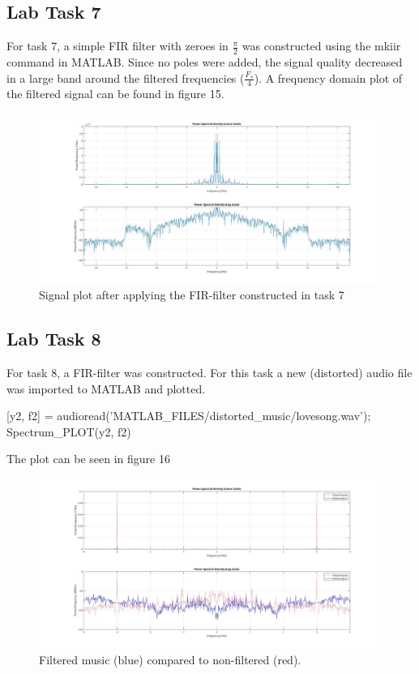 \documentclass[a4paper,11pt]{article}
\begin{document}
\subsection{Lab Task 7}
For task 7, a simple FIR filter with zeroes in \pm$\frac{\pi}{2}$ was constructed using the mkiir command in MATLAB. Since no poles were added, the signal quality decreased in a large band around the filtered frequencies ($\frac{F_s}{4}$). A frequency domain plot of the filtered signal can be found in figure 15.
\begin{figure}[H]
    \hspace{-45pt}\includegraphics[scale=0.28]{./images/Task7-filtered.jpg}
    \caption{Signal plot after applying the FIR-filter constructed in task 7}
    \label{fig:my_label}
\end{figure}
\subsection{Lab Task 8}
For task 8, a FIR-filter was constructed. For this task a new (distorted) audio file was imported to MATLAB and plotted.
\begin{ffcode}
[y2, f2] = audioread('MATLAB_FILES/distorted_music/lovesong.wav');
Spectrum_PLOT(y2, f2)
\end{ffcode}
The plot can be seen in figure 16
\begin{figure}[H]
    \hspace{-40pt}\includegraphics[scale=0.28]{./images/Task8-double-plot.jpg}
    \caption{Filtered music (blue) compared to non-filtered (red).}
    \label{fig:my_label}
\end{figure}
\end{document}

